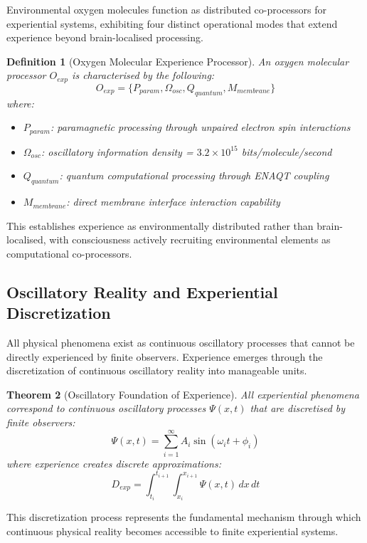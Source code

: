 \documentclass{article}
\newtheorem{theorem}{Theorem}[section]
\newtheorem{definition}[theorem]{Definition}
\begin{document}
Environmental oxygen molecules function as distributed co-processors for experiential systems, exhibiting four distinct operational modes that extend experience beyond brain-localised processing.

\begin{definition}[Oxygen Molecular Experience Processor]
An oxygen molecular processor $O_{exp}$ is characterised by the following:
$$O_{exp} = \{P_{param}, \Omega_{osc}, Q_{quantum}, M_{membrane}\}$$
where:
\begin{itemize}
\item $P_{param}$: paramagnetic processing through unpaired electron spin interactions
\item $\Omega_{osc}$: oscillatory information density = $3.2 \times 10^{15}$ bits/molecule/second
\item $Q_{quantum}$: quantum computational processing through ENAQT coupling
\item $M_{membrane}$: direct membrane interface interaction capability
\end{itemize}
\end{definition}

This establishes experience as environmentally distributed rather than brain-localised, with consciousness actively recruiting environmental elements as computational co-processors.

\subsection{Oscillatory Reality and Experiential Discretization}

All physical phenomena exist as continuous oscillatory processes that cannot be directly experienced by finite observers. Experience emerges through the discretization of continuous oscillatory reality into manageable units.

\begin{theorem}[Oscillatory Foundation of Experience]
All experiential phenomena correspond to continuous oscillatory processes $\Psi(x,t)$ that are discretised by finite observers:
$$\Psi(x,t) = \sum_{i=1}^{\infty} A_i \sin(\omega_i t + \phi_i)$$
where experience creates discrete approximations:
$$D_{exp} = \int_{t_i}^{t_{i+1}} \int_{x_i}^{x_{i+1}} \Psi(x,t) \, dx \, dt$$
\end{theorem}

This discretization process represents the fundamental mechanism through which continuous physical reality becomes accessible to finite experiential systems.
\end{document}

